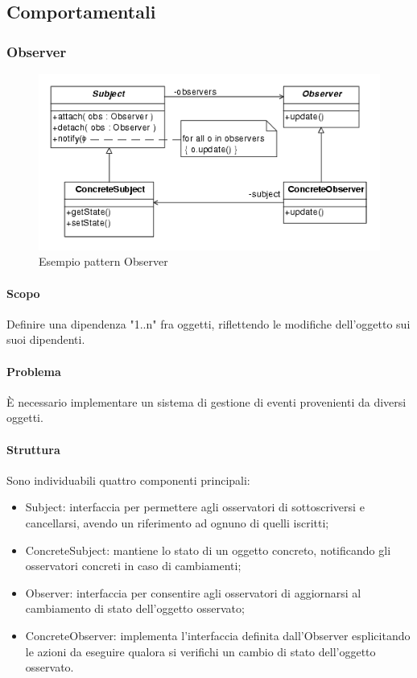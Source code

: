 \documentclass[../PianoDiQualifica.tex]{subfiles}
\begin{document}
		\subsection{Comportamentali}
			\subsubsection{Observer}
				\begin{figure}[H] \label{fig:Observer}
					\centering
					\includegraphics[scale=0.6]{Immagini/ObserverEx.png}
					\caption{Esempio pattern Observer}
				\end{figure}
				\paragraph{Scopo\\}
					Definire una dipendenza "1..n" fra oggetti, riflettendo le modifiche dell'oggetto
					sui suoi dipendenti.
				\paragraph{Problema\\}
					È necessario implementare un sistema di gestione di eventi provenienti da diversi
					oggetti.
				\paragraph{Struttura\\}
					Sono individuabili quattro componenti principali:
					\begin{itemize}
						\item Subject: interfaccia per permettere agli osservatori di sottoscriversi e
						cancellarsi, avendo un riferimento ad ognuno di quelli iscritti;
						\item ConcreteSubject: mantiene lo stato di un oggetto concreto, notificando
						gli osservatori concreti in caso di cambiamenti;
						\item Observer: interfaccia per consentire agli osservatori di aggiornarsi al
						cambiamento di stato dell'oggetto osservato;
						\item ConcreteObserver: implementa l'interfaccia definita dall'Observer
						esplicitando le azioni da eseguire qualora si verifichi un cambio di stato
						dell'oggetto osservato.
					\end{itemize}
\end{document}
